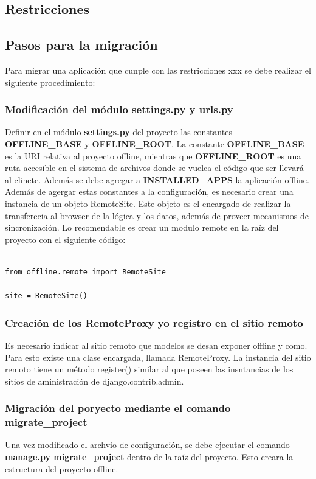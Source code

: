 \documentclass[a4paper]{report}
\begin{document}
\subsection{Restricciones}
\subsection{Pasos para la migración}
Para migrar una aplicación que cunple con las restricciones xxx se debe realizar
el siguiente procedimiento:
\subsubsection{Modificación del módulo settings.py y urls.py}
Definir en el módulo \textbf{settings.py} del proyecto las constantes
\textbf{OFFLINE\_BASE} y \textbf{OFFLINE\_ROOT}. La constante
\textbf{OFFLINE\_BASE} es la URI relativa al proyecto offline, mientras que 
\textbf{OFFLINE\_ROOT} es una ruta accesible en el sistema de archivos donde
se vuelca el código que ser llevará al clinete.
Además se debe agregar a \textbf{INSTALLED\_APPS} la aplicación offline.
Además de agergar estas constantes a la configuración, es necesario crear
una instancia de un objeto RemoteSite. Este objeto es el encargado de realizar
la transferecia al browser de la lógica y los datos, además de proveer
mecanismos de sincronización. Lo recomendable es crear un modulo remote en 
la raíz del proyecto con el siguiente código:
\begin{lstlisting}[style=python,
		   label=offlineization-site,
		   caption=Creando el sitio remoto]

from offline.remote import RemoteSite

site = RemoteSite()
\end{lstlisting}

\subsubsection{Creación de los RemoteProxy y\/o registro en el sitio remoto}
Es necesario indicar al sitio remoto que modelos se desan exponer offline y
como. Para esto existe una clase encargada, llamada RemoteProxy. 
La instancia del sitio remoto tiene un método register() similar al que poseen
las insntancias de los sitios de aministración de django.contrib.admin.




\subsubsection{Migración del poryecto mediante el comando migrate\_project}
Una vez modificado el archvio de configuración, se debe ejecutar el comando
\textbf{manage.py migrate\_project} dentro de la raíz del proyecto. Esto creara
la estructura del proyecto offline.
\end{document}
